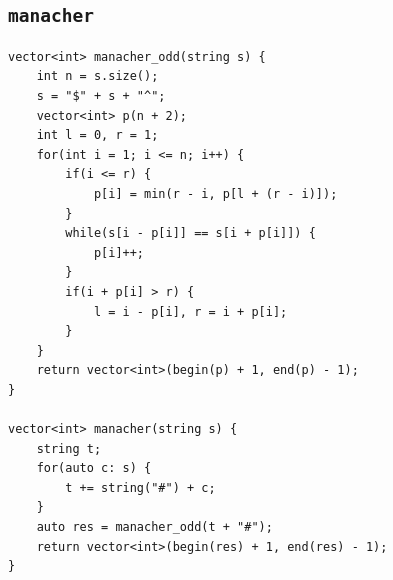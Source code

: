 \subsection{\texttt{manacher}}
\begin{lstlisting}
vector<int> manacher_odd(string s) {
    int n = s.size();
    s = "$" + s + "^";
    vector<int> p(n + 2);
    int l = 0, r = 1;
    for(int i = 1; i <= n; i++) {
        if(i <= r) {
            p[i] = min(r - i, p[l + (r - i)]);
        }
        while(s[i - p[i]] == s[i + p[i]]) {
            p[i]++;
        }
        if(i + p[i] > r) {
            l = i - p[i], r = i + p[i];
        }
    }
    return vector<int>(begin(p) + 1, end(p) - 1);
}

vector<int> manacher(string s) {
    string t;
    for(auto c: s) {
        t += string("#") + c;
    }
    auto res = manacher_odd(t + "#");
    return vector<int>(begin(res) + 1, end(res) - 1);
}\end{lstlisting}

